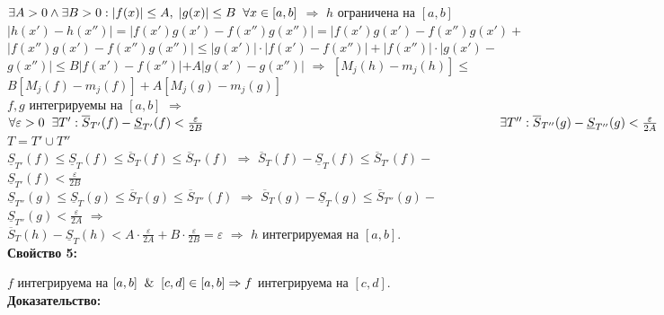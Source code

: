 \documentclass[a4paper,12pt]{article} %
\begin{document}
$ \exists A > 0 \wedge  \exists B > 0: |f(x)| \leq A, \hspace*{1mm} |g(x)| \leq B \hspace*{2mm} \forall x \in [a, b]$ $\Rightarrow$ $ h $ ограничена на $ [a, b]$ \\ [2 mm]
$| h(x') - h(x'') | = | f(x')g(x') - f(x'')g(x'')| = |f(x')g(x') - f(x'')g(x') + $ \\ [2 mm] $|f(x'')g(x') - f(x'')g(x'') | \leq |g(x')| \cdot |f(x') - f(x'')| + |f(x'')| \cdot | g(x') - $ \\ [2 mm] $ g(x'') | \leq B|f(x') - f(x'')| + A|g(x') - g(x'')| $ $\Rightarrow$  $[ M_j(h) - m_j(h)] \leq $ \\ [2mm] $  B[M_j(f) - m_j(f)] + A[M_j(g) - m_j(g)] $ \\ [3 mm]
$ f, g $ интегрируемы на $ [a, b] $ $ \Rightarrow $ $ \forall \varepsilon > 0 \hspace*{2mm} \exists T' : \overline{S}_{T'}(f) - \underline{S}_{T'} (f) < \frac {\varepsilon}{2B} \\ [2 mm] \hspace*{83mm} \exists T'' : \overline{S}_{T''}(g) - \underline{S}_{T''} (g) < \frac {\varepsilon}{2A} $ \\ [3 mm]
$ T = T' \cup T''$ \\ [2 mm]
$ \underline{S}_{T'}(f) \leq \underline{S}_{T}(f) \leq \overline{S}_{T}(f) \leq \overline{S}_{T'}(f) $ $ \Rightarrow $ $\overline{S}_{T}(f) - \underline{S}_{T} (f)  \leq \overline{S}_{T'}(f) - $ \\ [2mm] $\underline{S}_{T'} (f) < \frac {\varepsilon}{2B} $ \\ [2 mm]
$ \underline{S}_{T''}(g) \leq \underline{S}_{T}(g) \leq \overline{S}_{T}(g) \leq \overline{S}_{T''}(f) $ $ \Rightarrow $ $\overline{S}_{T}(g) - \underline{S}_{T} (g)  \leq \overline{S}_{T''}(g) - $ \\ [2mm] $\underline{S}_{T''} (g) < \frac {\varepsilon}{2A} $ $ \Rightarrow $ \\ [3 mm]
$\overline{S}_{T}(h) - \underline{S}_{T} (h) < A \cdot \frac {\varepsilon}{2A} + B \cdot \frac{\varepsilon}{2B} = \varepsilon$ $\Rightarrow$ $ h $ интегрируемая на $ [a, b] $.\\

\textbf{Свойство 5:}

$f$ интегрируема на $[a,b] \And [c,d] \in [a,b]\Rightarrow f$ интегрируема на $[c,d]$.\\

\textbf{Доказательство:}
\end{document}
